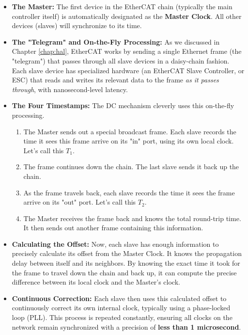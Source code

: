 \begin{itemize}
    \item \textbf{The Master:} The first device in the EtherCAT chain (typically the main controller itself) is automatically designated as the \textbf{Master Clock}. All other devices (slaves) will synchronize to its time.
    
    \item \textbf{The "Telegram" and On-the-Fly Processing:} As we discussed in Chapter \ref{chap:hal}, EtherCAT works by sending a single Ethernet frame (the "telegram") that passes through all slave devices in a daisy-chain fashion. Each slave device has specialized hardware (an EtherCAT Slave Controller, or ESC) that reads and writes its relevant data to the frame \textit{as it passes through}, with nanosecond-level latency.
    
    \item \textbf{The Four Timestamps:} The DC mechanism cleverly uses this on-the-fly processing.
    \begin{enumerate}
        \item The Master sends out a special broadcast frame. Each slave records the time it sees this frame arrive on its "in" port, using its own local clock. Let's call this $T_1$.
        \item The frame continues down the chain. The last slave sends it back up the chain.
        \item As the frame travels back, each slave records the time it sees the frame arrive on its "out" port. Let's call this $T_2$.
        \item The Master receives the frame back and knows the total round-trip time. It then sends out another frame containing this information.
    \end{enumerate}
    
    \item \textbf{Calculating the Offset:} Now, each slave has enough information to precisely calculate its offset from the Master Clock. It knows the propagation delay between itself and its neighbors. By knowing the exact time it took for the frame to travel down the chain and back up, it can compute the precise difference between its local clock and the Master's clock.
    
    \item \textbf{Continuous Correction:} Each slave then uses this calculated offset to continuously correct its own internal clock, typically using a phase-locked loop (PLL). This process is repeated constantly, ensuring all clocks on the network remain synchronized with a precision of \textbf{less than 1 microsecond}.
\end{itemize}

